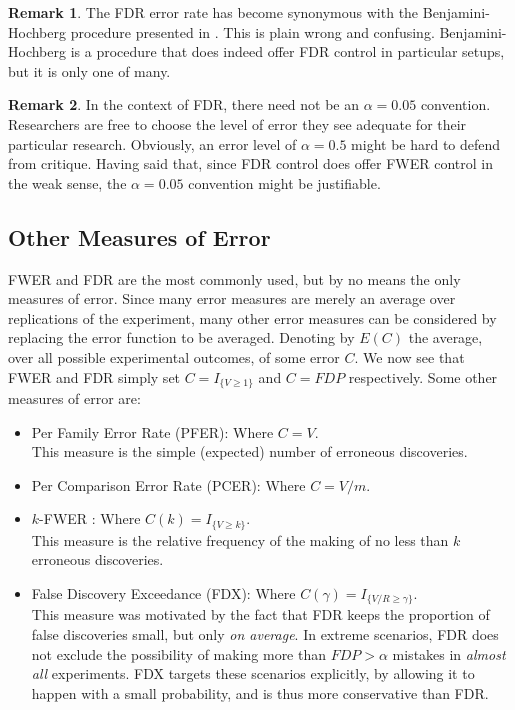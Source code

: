 \documentclass[review,12pt]{article}
\theoremstyle{definition}
\theoremstyle{definition}
\newtheorem{remark}{Remark}[section]
\begin{document}
\begin{remark}
The FDR error rate has become synonymous with the Benjamini-Hochberg procedure presented in \citep{benjamini_controlling_1995} . This is plain wrong and confusing. Benjamini-Hochberg is a procedure that does indeed offer FDR control in particular setups, but it is only one of many.
\end{remark}

\begin{remark}
In the context of FDR, there need not be an $\alpha=0.05$ convention. Researchers are free to choose the level of error they see adequate for their particular research. Obviously, an error level of $\alpha=0.5$ might be hard to defend from critique. Having said that, since FDR control does offer FWER control in the weak sense, the $\alpha=0.05$ convention might be justifiable.
\end{remark}




\subsection{\label{sec:other_measures}Other Measures of Error}
FWER and FDR are the most commonly used, but by no means the only measures of error. Since many error measures are merely an average over replications of the experiment, many other error measures can be considered by replacing the error function to be averaged. Denoting by $E(C)$ the average, over all possible experimental outcomes, of some error $C$. We now see that FWER and FDR simply set  $C = I_{\{ V \geq 1 \} } $ and $C = FDP$ respectively.
Some other measures of error are:



\begin{itemize}

\item Per Family Error Rate (PFER): Where $C=V$.\\
This measure is the simple (expected) number of erroneous discoveries. 

\item Per Comparison Error Rate (PCER): Where $C=V/m$.

\item $k$-FWER \citep{van_der_laan_augmentation_2004}: Where $C(k) = I_{\{ V \geq k \} }$.\\
This measure is the relative frequency of the making of no less than $k$ erroneous discoveries.

\item False Discovery Exceedance (FDX)\citep{genovese_exceedance_2006}: Where $C(\gamma) = I_{\{ V/R \geq \gamma \} }$.\\
This measure was motivated by the fact that FDR keeps the proportion of false discoveries small, but only \emph{on average}. 
In extreme scenarios, FDR does not exclude the possibility of making more than $FDP>\alpha$ mistakes in \emph{almost all} experiments. FDX targets these scenarios explicitly, by allowing it to happen with a small probability, and is thus more conservative than FDR. 

\end{itemize}
\end{document}
